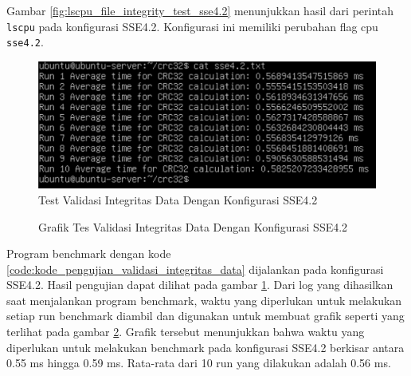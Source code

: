 Gambar \ref{fig:lscpu_file_integrity_test_sse4.2} menunjukkan hasil dari perintah \texttt{lscpu} pada konfigurasi SSE4.2. Konfigurasi ini memiliki perubahan flag cpu \texttt{sse4.2}.

\begin{figure}
    \centering
    \includegraphics[width=1\textwidth]
    {assets/pics/crc-test/sse4.2.jpeg}
    \caption{Test Validasi Integritas Data Dengan Konfigurasi SSE4.2}
    \label{fig:file_integrity_test_sse4.2}
\end{figure}

\begin{figure}
    \centering
    \caption{Grafik Tes Validasi Integritas Data Dengan Konfigurasi SSE4.2}
    \label{fig:file_integrity_test_sse4.2_graph}
\end{figure}

Program benchmark dengan kode \ref{code:kode_pengujian_validasi_integritas_data} dijalankan pada konfigurasi SSE4.2. Hasil pengujian dapat dilihat pada gambar \ref{fig:file_integrity_test_sse4.2}. Dari log yang dihasilkan saat menjalankan program benchmark, waktu yang diperlukan untuk melakukan setiap run benchmark diambil dan digunakan untuk membuat grafik seperti yang terlihat pada gambar \ref{fig:file_integrity_test_sse4.2_graph}. Grafik tersebut menunjukkan bahwa waktu yang diperlukan untuk melakukan benchmark pada konfigurasi SSE4.2 berkisar antara 0.55 ms hingga 0.59 ms. Rata-rata dari 10 run yang dilakukan adalah 0.56 ms.

